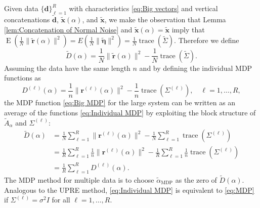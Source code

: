 \documentclass[12pt]{article}
\newcommand{\dVec}{\mathbf{d}}	%
\newcommand{\rVec}{\mathbf{r}}	%
\newcommand{\xVec}{\mathbf{x}}	%
\newcommand{\ctrans}[1]{{#1}^\mathsf{H}}	%
\newcommand{\inv}[1]{{#1}^{-1}}	%
\DeclareMathOperator{\trace}{trace}		%
\newcommand{\regparam}{\alpha}
\newcommand{\filt}{\phi}
\newcommand{\mfilt}{\psi}
\newcommand{\noise}{\eta}	%
\newcommand{\noiseSD}{\sigma}	%
\newcommand{\noiseVec}{\bm{\noise}}	%
\DeclareMathOperator{\E}{E}	%
\newcommand{\D}{D}	%
\begin{document}

Given data $\{\dVec\}_{\ell=1}^R$ with characteristics \eqref{eq:Big vectors} and vertical concatenations $\widetilde{\dVec}$, $\widetilde{\xVec}(\regparam)$, and $\widetilde{\xVec}$, we make the observation that Lemma \ref{lem:Concatenation of Normal Noise} and $\widetilde{\xVec}(\regparam) = \widetilde{\xVec}$ imply that $\E(\frac{1}{N}\|\widetilde{\rVec}(\regparam)\|^2) = E(\frac{1}{N}\|\widetilde{\noiseVec}\|^2) = \frac{1}{N}\trace(\widetilde{\Sigma})$. Therefore we define
\begin{equation}
\label{eq:Big MDP}
\widetilde{\D}(\regparam) = \frac{1}{N}\|\widetilde{\rVec}(\regparam)\|^2 - \frac{1}{N}\trace\left(\widetilde{\Sigma}\right).
\end{equation}
Assuming the data have the same length $n$ and by defining the individual MDP functions as
\begin{equation}
\label{eq:Individual MDP}
\D^{(\ell)}(\regparam) = \frac{1}{n}\|\rVec^{(\ell)}(\regparam)\|^2 - \frac{1}{n}\trace\left(\Sigma^{(\ell)}\right), \quad \ell = 1,\ldots,R,
\end{equation}
the MDP function \eqref{eq:Big MDP} for the large system can be written as an average of the functions \eqref{eq:Individual MDP} by exploiting the block structure of $\widetilde{A}_{\regparam}$ and $\Sigma^{(\ell)}$:
\begin{align}
\label{eq:Averaged MDP}
\widetilde{\D}(\regparam) &= \frac{1}{N}\sum_{\ell=1}^R \|\rVec^{(\ell)}(\regparam)\|^2 - \frac{1}{N}\sum_{\ell=1}^R \trace\left(\Sigma^{(\ell)}\right) \nonumber \\
&= \frac{1}{R}\sum_{\ell=1}^R \frac{1}{n}\|\rVec^{(\ell)}(\regparam)\|^2 - \frac{1}{R}\sum_{\ell=1}^R \frac{1}{n}\trace\left(\Sigma^{(\ell)}\right) \nonumber \\
&= \frac{1}{R}\sum_{\ell=1}^R \D^{(\ell)}(\regparam).
\end{align}
The MDP method for multiple data is to choose $\widetilde{\regparam}_{\textrm{MDP}}$ as the zero of $\widetilde{\D}(\regparam)$. Analogous to the UPRE method, \eqref{eq:Individual MDP} is equivalent to \eqref{eq:MDP} if $\Sigma^{(\ell)} = \noiseSD^2 I$ for all $\ell = 1,\ldots,R$.
\end{document}
